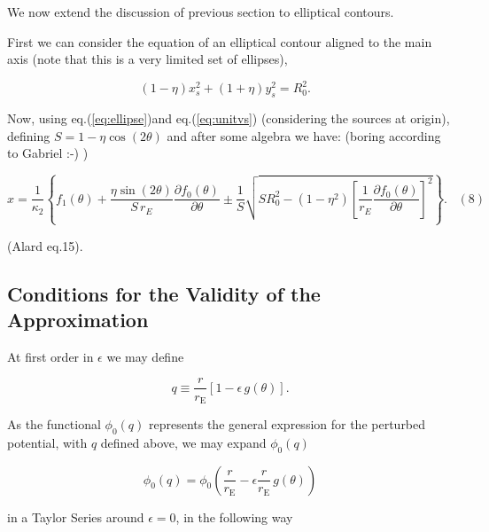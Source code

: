\documentclass{article}
\def\be{\begin{equation}}
\def\ee{\end{equation}}
\def\eqref{eq.(\ref}
\newcommand{\eps}{\epsilon}
\def \eps {\epsilon}
\def \te {\theta}
\def \rre {\frac{r}{r_{\mathrm{E}}}}
\begin{document}
We now extend the discussion of previous section to elliptical contours.

First we can consider the equation of an elliptical contour aligned to
the main axis (note that this is a very limited set of ellipses),

\be
\label{eq:ellipse}
(1-\eta)x_s^2 + (1+\eta)y_s^2 = R_{0}^2.\;\;\; 
\ee



Now, using \eqref{eq:ellipse})and \eqref{eq:unitvs}) (considering the sources at origin), defining $S = 1-\eta \cos(2\theta)$ and after some algebra we have: (boring according to Gabriel :-) )

\be
x = \frac{1}{\kappa_2} \left\{f_{1}(\theta) + \frac{\eta\sin(2\theta)}{S \, r_E}\frac{\partial f_0(\theta)}{\partial \theta} \pm \frac{1}{S}\sqrt{SR_{0}^2 - (1-\eta^2)\left[ \frac{1}{r_E}\frac{\partial f_0(\theta)}{\partial \theta}\right]^2}  \right\}. \;\;\; (8)
\ee

(Alard eq.15).



\subsection{Conditions for the Validity of the Approximation}

At first order in $\eps$ we may define  

\begin{equation}
 q \equiv \frac{r}{r_{\mathrm{E}}}[1-\eps\,g(\te)].
\end{equation}

As the functional $\phi_0(q)$ represents the general expression 
for the perturbed potential, with $q$ defined above, we may expand $\phi_0(q)$

\begin{displaymath}
 \phi_0(q)=\phi_0\left(\rre-\eps\rre\,g(\te)\right)
\end{displaymath}

\noindent in a Taylor Series around $\eps=0$, in the following way
\end{document}
